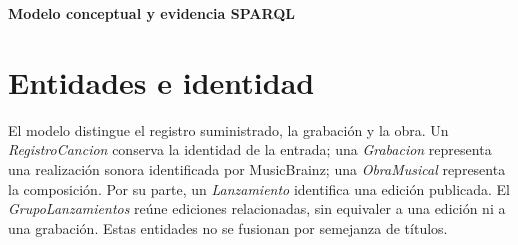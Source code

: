 \documentclass[11pt,a4paper]{article}
\begin{document}
\begin{center}
{\LARGE\bfseries Modelo conceptual y evidencia SPARQL}\par
\vspace{4pt}{\normalsize Anexo de la etapa 1 -- Grupo 2}
\end{center}
\section{Entidades e identidad}
El modelo distingue el registro suministrado, la grabación y la obra. Un \emph{RegistroCancion} conserva la identidad  de la entrada; una \emph{Grabacion} representa una realización sonora identificada por MusicBrainz; una \emph{ObraMusical} representa la composición. Por su parte, un \emph{Lanzamiento} identifica una edición publicada. El \emph{GrupoLanzamientos} reúne ediciones relacionadas, sin equivaler a una edición ni a una grabación. Estas entidades no se fusionan por semejanza de títulos.
\end{document}
